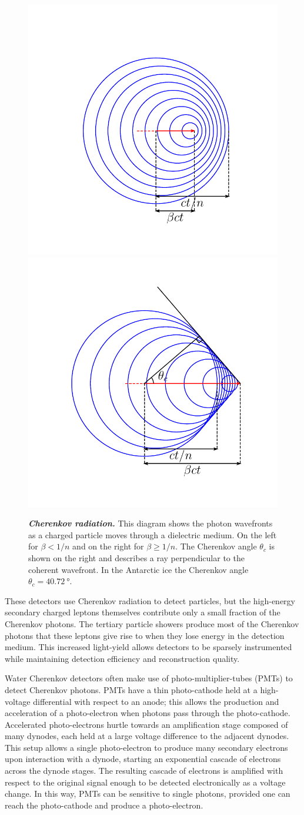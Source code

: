 \begin{figure}
	\centering
	\includegraphics[width=0.45\linewidth]{figures/no_cherenkov}
	\includegraphics[width=0.45\linewidth]{figures/cherenkov}
	\caption{\textbf{\textit{Cherenkov radiation.}}
		This diagram shows the photon wavefronts as a charged particle moves through a dielectric medium.
		On the left for $\beta < 1/n$ and on the right for $\beta \geq 1/n$.
		The Cherenkov angle $\theta_c$ is shown on the right and describes a ray perpendicular to the coherent wavefront.
		In the Antarctic ice the Cherenkov angle $\theta_c=\SI{40.72}\degree$.
	}\label{fig:cherenkov}
\end{figure}

These detectors use Cherenkov radiation to detect particles, but the high-energy secondary charged leptons themselves contribute only a small fraction of the Cherenkov photons.
The tertiary particle showers produce most of the Cherenkov photons that these leptons give rise to when they lose energy in the detection medium.
This increased light-yield allows detectors to be sparsely instrumented while maintaining detection efficiency and reconstruction quality.

Water Cherenkov detectors often make use of photo-multiplier-tubes (PMTs) to detect Cherenkov photons.
PMTs have a thin photo-cathode held at a high-voltage differential with respect to an anode; this allows the production and acceleration of a photo-electron when photons pass through the photo-cathode.
Accelerated photo-electrons hurtle towards an amplification stage composed of many dynodes, each held at a large voltage difference to the adjacent dynodes.
This setup allows a single photo-electron to produce many secondary electrons upon interaction with a dynode, starting an exponential cascade of electrons across the dynode stages.
The resulting cascade of electrons is amplified with respect to the original signal enough to be detected electronically as a voltage change.
In this way, PMTs can be sensitive to single photons, provided one can reach the photo-cathode and produce a photo-electron.

